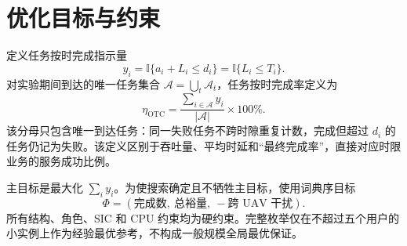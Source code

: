 \section{优化目标与约束}
定义任务按时完成指示量
\begin{equation}
y_i=\mathbb I\{a_i+L_i\le d_i\}=\mathbb I\{L_i\le T_i\}.
\end{equation}
对实验期间到达的唯一任务集合 $\mathcal A=\bigcup_t\mathcal A_t$，任务按时完成率定义为
\begin{equation}
\eta_{\mathrm{OTC}}=\frac{\sum_{i\in\mathcal A}y_i}{|\mathcal A|}\times100\%.
\end{equation}
该分母只包含唯一到达任务：同一失败任务不跨时隙重复计数，完成但超过 $d_i$ 的任务仍记为失败。该定义区别于吞吐量、平均时延和“最终完成率”，直接对应时限业务的服务成功比例。

主目标是最大化 $\sum_i y_i$。为使搜索确定且不牺牲主目标，使用词典序目标
\begin{equation}
\Phi=(\text{完成数},\ \text{总裕量},\ -\text{跨 UAV 干扰}).
\end{equation}
所有结构、角色、SIC 和 CPU 约束均为硬约束。完整枚举仅在不超过五个用户的小实例上作为经验最优参考，不构成一般规模全局最优保证。
